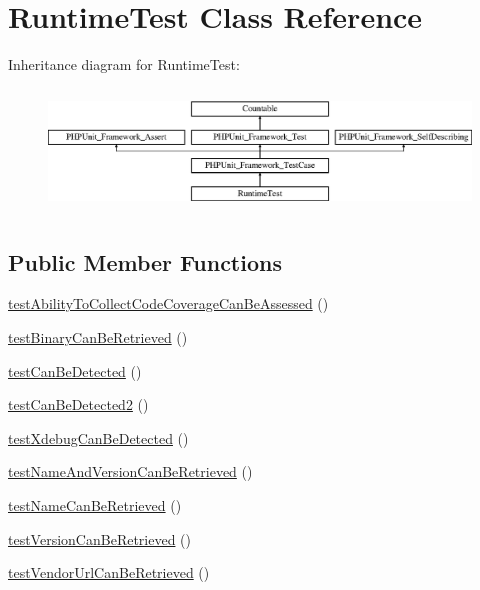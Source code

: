 \hypertarget{class_sebastian_bergmann_1_1_environment_1_1_runtime_test}{}\section{Runtime\+Test Class Reference}
\label{class_sebastian_bergmann_1_1_environment_1_1_runtime_test}
Inheritance diagram for Runtime\+Test\+:\begin{figure}[H]
\begin{center}
\leavevmode
\includegraphics[height=3.303835cm]{class_sebastian_bergmann_1_1_environment_1_1_runtime_test}
\end{center}
\end{figure}
\subsection*{Public Member Functions}
\begin{DoxyCompactItemize}
\item 
\mbox{\hyperlink{class_sebastian_bergmann_1_1_environment_1_1_runtime_test_a3ea787be990b7ed84d60a0d0da0397e0}{test\+Ability\+To\+Collect\+Code\+Coverage\+Can\+Be\+Assessed}} ()
\item 
\mbox{\hyperlink{class_sebastian_bergmann_1_1_environment_1_1_runtime_test_ab451d6363180682d64911ba8ea356507}{test\+Binary\+Can\+Be\+Retrieved}} ()
\item 
\mbox{\hyperlink{class_sebastian_bergmann_1_1_environment_1_1_runtime_test_a18782a54ec85bdc27e24cb66f07c12cc}{test\+Can\+Be\+Detected}} ()
\item 
\mbox{\hyperlink{class_sebastian_bergmann_1_1_environment_1_1_runtime_test_a919f8977d265f15a04f2bf405d7bf0b6}{test\+Can\+Be\+Detected2}} ()
\item 
\mbox{\hyperlink{class_sebastian_bergmann_1_1_environment_1_1_runtime_test_a322b0f14395333154f816a3d8a5d7b86}{test\+Xdebug\+Can\+Be\+Detected}} ()
\item 
\mbox{\hyperlink{class_sebastian_bergmann_1_1_environment_1_1_runtime_test_a0a81504b20cb2f324952dd74d62d086f}{test\+Name\+And\+Version\+Can\+Be\+Retrieved}} ()
\item 
\mbox{\hyperlink{class_sebastian_bergmann_1_1_environment_1_1_runtime_test_a0f2bf7a3e1eba9fe35711f3629f43e71}{test\+Name\+Can\+Be\+Retrieved}} ()
\item 
\mbox{\hyperlink{class_sebastian_bergmann_1_1_environment_1_1_runtime_test_ac05595ad4f59861e3e2e406e57d6396e}{test\+Version\+Can\+Be\+Retrieved}} ()
\item 
\mbox{\hyperlink{class_sebastian_bergmann_1_1_environment_1_1_runtime_test_abd83f11666c39cf942153520b7743d76}{test\+Vendor\+Url\+Can\+Be\+Retrieved}} ()
\end{DoxyCompactItemize}
